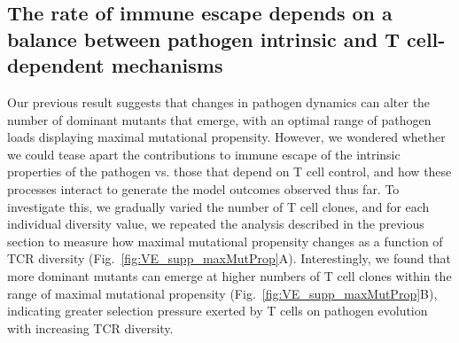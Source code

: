\subsection{The rate of immune escape depends on a balance between pathogen intrinsic and T cell-dependent mechanisms}

Our previous result suggests that changes in pathogen dynamics can alter the number of dominant mutants that emerge, with an optimal range of pathogen loads displaying maximal mutational propensity. However, we wondered whether we could tease apart the contributions to immune escape of the intrinsic properties of the pathogen vs. those that depend on T cell control, and how these processes interact to generate the model outcomes observed thus far. To investigate this, we gradually varied the number of T cell clones, and for each individual diversity value, we repeated the analysis described in the previous section to measure how maximal mutational propensity changes as a function of TCR diversity (Fig.~\ref{fig:VE_supp_maxMutProp}A). Interestingly, we found that more dominant mutants can emerge at higher numbers of T cell clones within the range of maximal mutational propensity (Fig.~\ref{fig:VE_supp_maxMutProp}B), indicating greater selection pressure exerted by T cells on pathogen evolution with increasing TCR diversity.

